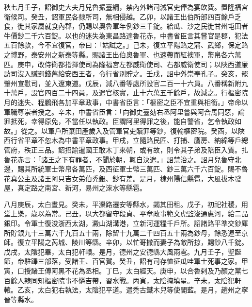 \begin{pinyinscope}
 秋七月壬子，詔御史大夫月兒魯振臺綱，禁內外諸司減官吏俸為宴飲費。置隆福宮衛候司。癸丑，詔軍民各隸所司，無相侵越。乙卯，以諸王出伯所部四百餘戶乏食，徙其家屬就食內郡，仍賜以奧魯軍年例鈔三千錠。給瓜、沙之民徙甘州屯田者牛價鈔二千六百錠。以也的迷失為東昌路達魯花赤，中書省臣言其嘗官是郡，犯法五百餘款，今不宜復官，帝曰：「姑試之。」己未，復立平陽路之蒲、武鄉，保定路之博野，泰安州之新泰等縣。賜諸王出伯奧魯軍、也速帶而紅襖軍，幣帛各六萬匹。庚申，改侍衛都指揮使司為隆福宮左都威衛使司、右都威衛使司；以陜西道廉訪司沒入贓罰錢舊給安西王者，令行省別貯之。壬戌，詔中外崇奉孔子。癸亥，罷肇州宣慰司，並入遼東道。戊辰，減八番等處所設官二百一十六員。八番稱新附九十萬戶，設官四百二十四員，及遣官核實，止十六萬五千餘戶，故減之。行樞密院月的迷失、程鵬飛各加平章政事，中書省臣言：「樞密之臣不宜重與相銜。」帝命以軍職尊崇者授之。辛未，中書省臣言：「向御史臺劾右丞阿里嘗與阿合馬同惡，論罪抵死，幸得原免，不當任以執政。臣謂阿里得罪之後，能自警省，乞令執政如故。」從之。以軍戶所棄田產歲入及管軍官吏贖罪等鈔，復輸樞密院。癸酉，以陜西行省平章不忽木為中書平章政事。甲戌，立隨路民匠、打捕、鷹房、納綿等戶總管府，秩正三品。詔招諭暹國王敢木丁來朝，或有故，則令其子弟及陪臣入質。扎魯花赤言：「諸王之下有罪者，不聞於朝，輒自決遣。」詔禁治之。詔月兒魯守北邊，賜其所統軍士幣帛各萬匹，及西征軍士幣三萬匹、鈔三萬六千六百錠。賜不魯花真公主及諸王阿只吉女弟伯禿銀、鈔有差。是月，棣州陽信縣雹，大風拔木發屋，真定路之南宮、新河，易州之淶水等縣雹。



 八月庚辰，太白晝見。癸未，平灤路遷安等縣水，蠲其田租。戊子，初祀社稷，用堂上樂，歲以為常。己丑，以大都留守段貞、平章政事範文虎監浚通惠河，給二品銀印。令軍士復浚浙西太湖，澱山湖溝港，立新河運糧千戶所。詔諸路平準交鈔庫所貯銀九十三萬六千九百五十兩，除留十九萬二千四百五十兩為鈔母，餘悉運至京師。復立平陽之芮城、陵川等縣。辛卯，以忙哥撒而妻子為敵所掠，賜鈔八千錠。戊戌，太陰犯畢，太白犯軒轅。是月，德州之安德縣大風雨雹。九月壬子，聖誕節，帝駐蹕三部落，受諸王、百官賀。癸丑，詔有司存恤征瓜哇軍士死事之家。甲寅，口授諸王傅阿黑不花為丞相。丁巳，太白經天。庚申，以合魯剌及乃顏之黨七百餘人隸同知樞密院事不憐吉帶，習水戰。丙寅，太陰掩填星。辛未，太陰犯軒轅。乙亥，太白犯右執法，太陰犯平道。遣禿古鐵木兒等使閣藍。是月，趙州之寧晉等縣水。




\end{pinyinscope}
